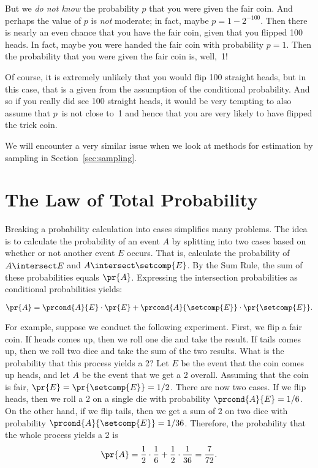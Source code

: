 But we \emph{do not know} the probability $p$ that you were given
the fair coin.  And perhaps the value of $p$ is \emph{not} moderate;
in fact, maybe $p = 1 - 2^{-100}$.  Then there is nearly an even
chance that you have the fair coin, given that you flipped 100 heads.
In fact, maybe you were handed the fair coin with probability $p = 1$.
Then the probability that you were given the fair coin is, well,~1!

Of course, it is extremely unlikely that you would flip 100 straight
heads, but in this case, that is a given from the assumption of the
conditional probability.  And so if you really did see 100 straight
heads, it would be very tempting to also assume that $p$~is not close
to~1 and hence that you are very likely to have flipped the trick
coin.

We will encounter a very similar issue when we look at methods for
estimation by sampling in Section~\ref{sec:sampling}.
\fi


\section{The Law of Total Probability}\label{sec:total_probability}

Breaking a probability calculation into cases simplifies many
problems.  The idea is to calculate the probability of an event $A$ by
splitting into two cases based on whether or not another event $E$
occurs.  That is, calculate the probability of $A\nobreak
\intersect\nobreak E$ and $A \intersect \setcomp{E}$.  By the Sum
Rule, the sum of these probabilities equals $\pr{A}$.  Expressing the
intersection probabilities as conditional probabilities yields:
\begin{rul}\label{total_prob_Ebar}
\[
\pr{A} = \prcond{A}{E} \cdot \pr{E} +
         \prcond{A}{\setcomp{E}} \cdot \pr{\setcomp{E}}.
\]
\end{rul}

For example, suppose we conduct the following experiment.  First, we
flip a fair coin.  If heads comes up, then we roll one die and take the
result.  If tails comes up, then we roll two dice and take the sum of
the two results.  What is the probability that this process yields a
2?  Let $E$ be the event that the coin comes up heads, and let $A$ be
the event that we get a 2 overall.  Assuming that the coin is fair,
$\pr{E} = \pr{\setcomp{E}} = 1/2$.  There are now two cases. If we
flip heads, then we roll a 2 on a single die with probability
$\prcond{A}{E} = 1/6$.  On the other hand, if we flip tails, then we
get a sum of 2 on two dice with probability
$\prcond{A}{\setcomp{E}} = 1/36$.  Therefore, the probability that
the whole process yields a 2 is
\[
\pr{A} = \frac{1}{2} \cdot \frac{1}{6} + \frac{1}{2} \cdot \frac{1}{36} =
  \frac{7}{72}.
\]

